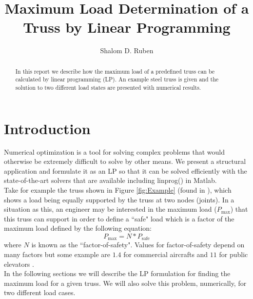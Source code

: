 \documentclass[12pt]{article}
\title{Maximum Load Determination of a Truss by Linear Programming}
\author{Shalom D. Ruben}
\date{}
\begin{document}
\maketitle

\begin{abstract}
In this report we describe how the maximum load of a predefined truss can be calculated by linear programming (LP).  An example steel truss is given and the solution to two different load states are presented with numerical results.  
\end{abstract}

\section{Introduction}
Numerical optimization is a tool for solving complex problems that would otherwise be extremely difficult to solve by other means.  We present a structural application and formulate it as an LP so that it can be solved efficiently with the state-of-the-art solvers that are available including linprog() in Matlab.\\

Take for example the truss shown in Figure \ref{fig:Example} (found in \cite{EngOpt}), which shows a load being equally supported by the truss at two nodes (joints).  In a situation as this, an engineer may be interested in the maximum load ($P_\textrm{max}$) that this truss can support in order to define a ``safe" load which is a factor of the maximum load defined by the following equation:
\begin{equation}
P_\textrm{max} = N*P_\textrm{safe}
\end{equation}
where $N$ is known as the ``factor-of-safety".  Values for factor-of-safety depend on many factors but some example are $1.4$ for commercial aircrafts and $11$ for public elevators \cite{MachineDesign}.\\

In the following sections we will describe the LP formulation for finding the maximum load for a given truss.  We will also solve this problem, numerically, for two different load cases.  
\end{document}
